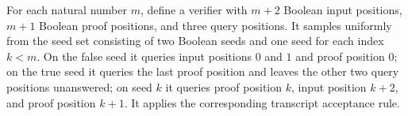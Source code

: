 \begin{definition}
\label{FABL.oddWeightPartialSumPCPPSystem}
\leanok
{}
For each natural number $m$, define a verifier with $m+2$ Boolean input positions, $m+1$
Boolean proof positions, and three query positions. It samples uniformly from the seed
set consisting of two Boolean seeds and one seed for each index $k<m$. On the false seed
it queries input positions $0$ and $1$ and proof position $0$; on the true seed it
queries the last proof position and leaves the other two query positions unanswered; on
seed $k$ it queries proof position $k$, input position $k+2$, and proof position $k+1$.
It applies the corresponding transcript acceptance rule.
\end{definition}

